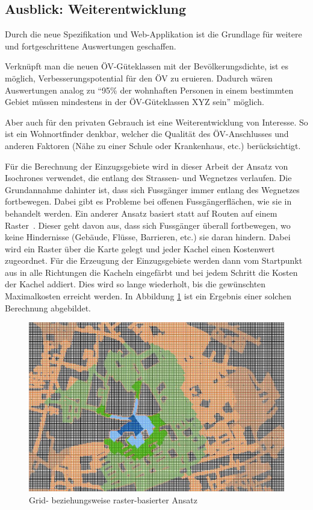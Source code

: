\subsection{Ausblick: Weiterentwicklung}
\label{Resultate:Ausblick: Weiterentwicklung}

Durch die neue Spezifikation und Web-Applikation ist die Grundlage für weitere und fortgeschrittene Auswertungen geschaffen.

Verknüpft man die neuen \acs{ÖV}-Güteklassen mit der Bevölkerungsdichte, ist es möglich, Verbesserungspotential für den \acs{ÖV} zu eruieren.
Dadurch wären Auswertungen analog zu "`95\% der wohnhaften Personen in einem bestimmten Gebiet müssen mindestens in der \acs{ÖV}-Güteklassen XYZ sein"' möglich.

Aber auch für den privaten Gebrauch ist eine Weiterentwicklung von Interesse.
So ist ein Wohnortfinder denkbar, welcher die Qualität des \acs{ÖV}-Anschlusses und anderen Faktoren (Nähe zu einer Schule oder Krankenhaus, etc.) berücksichtigt.

Für die Berechnung der Einzugsgebiete wird in dieser Arbeit der Ansatz von \glspl{Isochrone} verwendet, die entlang des Strassen- und Wegnetzes verlaufen.
Die Grundannahme dahinter ist, dass sich Fussgänger immer entlang des Wegnetzes fortbewegen.
Dabei gibt es Probleme bei offenen Fussgängerflächen, wie sie in~\cite{plaza_route} behandelt werden.
Ein anderer Ansatz basiert statt auf Routen auf einem Raster~\cite{pedestrian_accessibility_planning}. Dieser geht davon aus, dass sich Fussgänger überall fortbewegen, wo keine Hindernisse (Gebäude, Flüsse, Barrieren, etc.) sie daran hindern.
Dabei wird ein Raster über die Karte gelegt und jeder Kachel einen Kostenwert zugeordnet.
Für die Erzeugung der Einzugsgebiete werden dann vom Startpunkt aus in alle Richtungen die Kacheln eingefärbt und bei jedem Schritt die Kosten der Kachel addiert.
Dies wird so lange wiederholt, bis die gewünschten Maximalkosten erreicht werden.
In Abbildung \ref{fig:grid_based_approach} ist ein Ergebnis einer solchen Berechnung abgebildet.

\begin{figure}[ht]
    \centering
    \includegraphics[width=0.6\linewidth]{start/img/grid_based_approach.png}
    \caption[Grid- beziehungsweise raster-basierter Ansatz]{Grid- beziehungsweise raster-basierter Ansatz~\cite{pedestrian_accessibility_planning}}
    \label{fig:grid_based_approach}
\end{figure}

